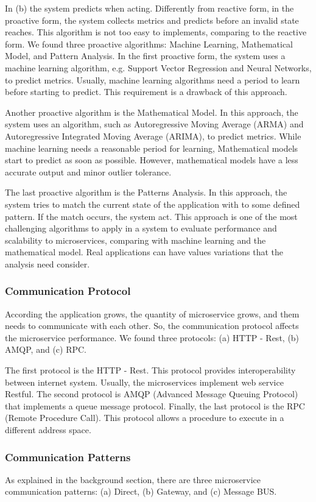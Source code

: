 In (b) the system predicts when acting. Differently from reactive form, in the proactive form, the system collects metrics and predicts before an invalid state reaches. This algorithm is not too easy to implements, comparing to the reactive form. We found three proactive algorithms: Machine Learning, Mathematical Model, and Pattern Analysis. 
In the first proactive form, the system uses a machine learning algorithm, e.g. Support Vector Regression and Neural Networks, to predict metrics. Usually, machine learning algorithms need a period to learn before starting to predict. This requirement is a drawback of this approach.

Another proactive algorithm is the Mathematical Model. In this approach, the system uses an algorithm, such as Autoregressive Moving Average (ARMA) and Autoregressive Integrated Moving Average (ARIMA), to predict metrics. While machine learning needs a reasonable period for learning, Mathematical models start to predict as soon as possible. However, mathematical models have a less accurate output and minor outlier tolerance. 

The last proactive algorithm is the Patterns Analysis. In this approach, the system tries to match the current state of the application with to some defined pattern. If the match occurs, the system act. This approach is one of the most challenging algorithms to apply in a system to evaluate performance and scalability to microservices, comparing with machine learning and the mathematical model. Real applications can have values variations that the analysis need consider.

\subsubsection{Communication Protocol}
According the application grows, the quantity of microservice grows, and them needs to communicate with each other. So, the communication protocol affects the microservice performance. We found three protocols: (a) HTTP - Rest, (b) AMQP, and (c) RPC. 

The first protocol is the HTTP - Rest. This protocol provides interoperability between internet system. Usually, the microservices implement web service Restful. The second protocol is AMQP (Advanced Message Queuing Protocol) that implements a queue message protocol. Finally, the last protocol is the RPC (Remote Procedure Call). This protocol allows a procedure to execute in a different address space. 

\subsubsection{Communication Patterns}
As explained in the background section, there are three microservice communication patterns: (a) Direct, (b) Gateway, and (c) Message BUS.

